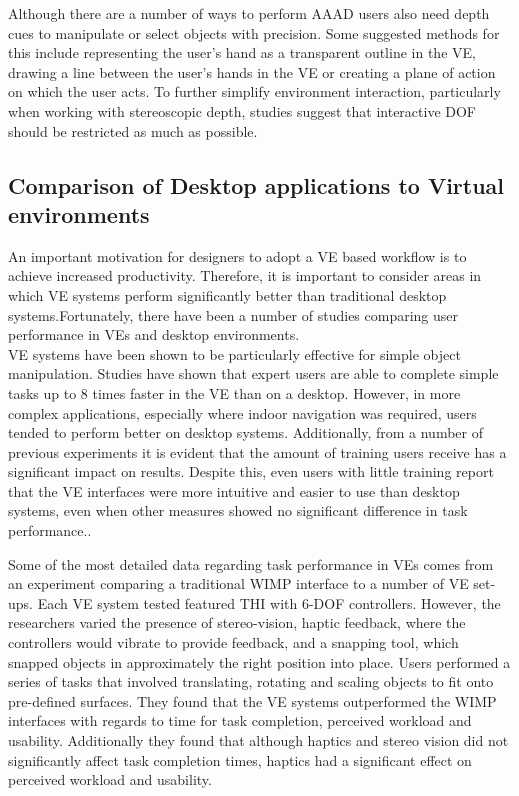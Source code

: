\documentclass{sig-alternate-05-2015}
\begin{document}
 Although there are a number of ways to perform AAAD users also need depth cues to manipulate or select objects with precision.\cite{Schultheis2012} Some suggested methods for this include representing the user's hand as a transparent outline in the VE\cite{Hinckley1994}, drawing a line between the user's hands in the VE\cite{Schultheis2012} or creating a plane of action\cite{Mine2014} on which the user acts. To further simplify environment interaction, particularly when working with stereoscopic depth, studies suggest that interactive DOF should be restricted as much as possible\cite{Bowman2001}.

\subsection{Comparison of Desktop applications to Virtual environments}
An important motivation for designers to adopt a VE based workflow is to achieve increased productivity. Therefore, it is important to consider areas in which VE systems perform significantly better than traditional desktop systems.Fortunately, there have been a number of studies comparing user performance in VEs and desktop environments.\\

VE systems have been shown to be particularly effective for simple object manipulation. Studies have shown that expert users are able to complete simple tasks up to 8 times faster in the VE than on a desktop\cite{Schultheis2012}. However, in more complex applications, especially where indoor navigation was required, users tended to perform better on desktop systems\cite{SousaSantos2009}. Additionally, from a number of previous experiments it is evident that the amount of training users receive has a significant impact on results. Despite this, even users with little training report that the VE interfaces were more intuitive and easier to use than desktop systems, even when other measures showed no significant difference in task performance.\cite{Toma2012}.

Some of the most detailed data regarding task performance in VEs comes from an experiment comparing a traditional WIMP interface to a number of VE set-ups. Each VE system tested featured THI with 6-DOF controllers. However, the researchers varied the presence of stereo-vision, haptic feedback, where the controllers would vibrate to provide feedback, and a snapping tool, which snapped objects in approximately the right position into place\cite{Scali2003}. Users performed a series of tasks that involved translating, rotating and scaling objects to fit onto pre-defined surfaces. They found that the VE systems outperformed the WIMP interfaces with regards to time for task completion, perceived workload and usability. Additionally they found that although haptics and stereo vision did not significantly affect task completion times, haptics had a significant effect on perceived workload and usability.
\end{document}
